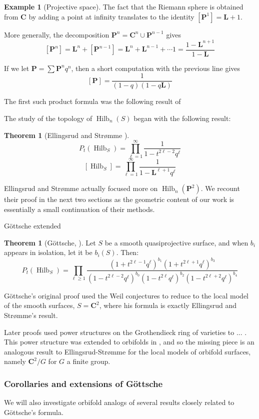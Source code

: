 \documentclass{amsart}[12pt]
\theoremstyle{definition}
\newtheorem{theorem}[dummy]{Theorem}
\newtheorem{example}[dummy]{Example}
\newcommand{\C}{\mathbf{C}}
\newcommand{\LL}{\mathbf{L}}
\newcommand{\proj}{\mathbf{P}}
\DeclareMathOperator{\Hilb}{Hilb}
\newcommand{\HG}{\Hilb}
\begin{document}
\begin{example}[Projective space]
The fact that the Riemann sphere is obtained from $\C$ by adding a point at infinity translates to the identity $[\proj^1]=\LL+1$.

More generally, the decomposition $\proj^n=\C^n\cup \proj^{n-1}$ gives
$$[\proj^n]=\LL^n+[\proj^{n-1}]=\LL^n+\LL^{n-1}+\cdots 1=\frac{1-\LL^{n+1}}{1-\LL}$$


If we let $\proj=\sum \proj^nq^n$, then a short computation with the previous line gives
$$[\proj]=\frac{1}{(1-q)(1-q\LL)}$$
\end{example}


The first such product formula was the following result of 

The study of the topology of $\Hilb_n(S)$ began with the following result:
\begin{theorem}[Ellingsrud and Str\o mme \cite{ES}]
$$P_t(\HG_S)=\prod_{\ell=1}^\infty \frac{1}{1-t^{2\ell-2}q^\ell}$$
$$[\HG_S]=\prod_{\ell=1}^\infty \frac{1}{1-\LL^{\ell +1}q^\ell}$$
\end{theorem}



Ellingsrud and Str\o mme actually focused more on $\Hilb_n(\proj^2)$.  We recount their proof in the next two sections as the geometric content of our work is essentially a small continuation of their methods.



G\"ottsche extended 

\begin{theorem}[G\"ottsche, \cite{gottsche}]
Let $S$ be a smooth quasiprojective surface, and when $b_i$ appears in isolation, let it be $b_i(S)$.  Then:
$$P_t(\HG_S)=\prod_{\ell\geq 1} \frac{(1+t^{2\ell-1}q^\ell)^{b_1}(1+t^{2\ell+1}q^\ell)^{b_3}}{(1-t^{2\ell-2}q^\ell)^{b_0}(1-t^{2\ell}q^\ell)^{b_2}(1-t^{2\ell+2}q^\ell)^{b_4}}$$
\end{theorem}

G\"ottsche's original proof used the Weil conjectures to reduce to the local model of the smooth surfaces, $S=\C^2$, where his formula is exactly Ellingsrud and Str\o mme's result.

Later proofs used power structures on the Grothendieck ring of varieties to  ...
.  This power structure was extended to orbifolds in \cite{}, and so the missing piece is an analogous result to Ellingsrud-Str\o mme for the local models of orbifold surfaces, namely $\C^2/G$ for $G$ a finite group.  

\subsubsection{Corollaries and extensions of G\"ottsche}
We will also investigate orbifold analogs of several results closely related to G\"ottsche's formula.
\end{document}

